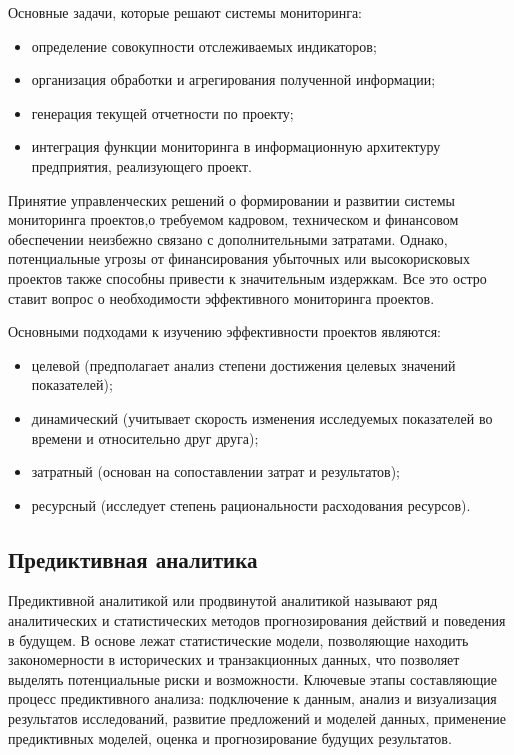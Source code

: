 \documentclass[12pt,a4paper]{article} %
\begin{document}
Основные задачи, которые решают системы мониторинга:
\begin{itemize}
	\item определение совокупности отслеживаемых индикаторов;
	\item организация обработки и агрегирования полученной информации;
	\item генерация текущей отчетности по проекту;
	\item интеграция функции мониторинга в информационную архитектуру предприятия, реализующего проект.
\end{itemize}

Принятие управленческих решений о формировании и развитии системы мониторинга проектов,о требуемом кадровом, техническом и финансовом обеспечении неизбежно связано с дополнительными затратами. Однако, потенциальные угрозы от финансирования убыточных или высокорисковых проектов также способны привести к значительным издержкам. Все это остро ставит вопрос о необходимости эффективного мониторинга проектов.

Основными подходами к изучению эффективности проектов являются:
\begin{itemize}
	\item целевой (предполагает анализ степени достижения целевых значений показателей);
	\item динамический (учитывает скорость изменения исследуемых показателей во времени и относительно друг друга);
	\item затратный (основан на сопоставлении затрат и результатов);
	\item ресурсный (исследует степень рациональности расходования ресурсов).
\end{itemize}

\subsection{Предиктивная аналитика}

Предиктивной аналитикой или продвинутой аналитикой называют ряд аналитических и статистических методов прогнозирования действий и поведения в будущем. В основе лежат статистические модели, позволяющие находить закономерности в исторических и транзакционных данных, что позволяет выделять потенциальные риски и возможности. Ключевые этапы составляющие процесс предиктивного анализа: подключение к данным, анализ и визуализация результатов исследований, развитие предложений и моделей данных, применение предиктивных моделей, оценка и прогнозирование будущих результатов.
\end{document}
